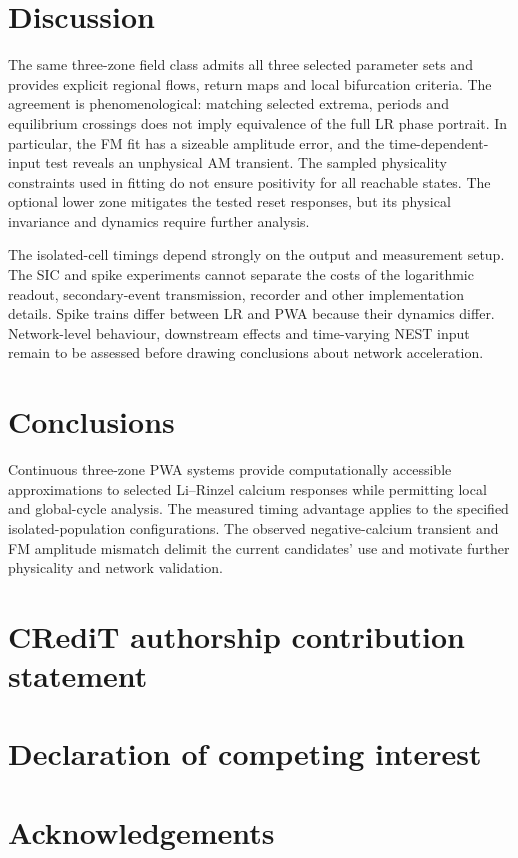 \documentclass[final,5p,times,twocolumn]{elsarticle}
\begin{document}
\section{Discussion}
\label{sec:discussion}
The same three-zone field class admits all three selected parameter sets and
provides explicit regional flows, return maps and local bifurcation criteria.
The agreement is phenomenological: matching selected extrema, periods and
equilibrium crossings does not imply equivalence of the full LR phase portrait.
In particular, the FM fit has a sizeable amplitude error, and the
time-dependent-input test reveals an unphysical AM transient. The sampled
physicality constraints used in fitting do not ensure positivity for all
reachable states. The optional lower zone mitigates the tested reset responses,
but its physical invariance and dynamics require further analysis.

The isolated-cell timings depend strongly on the output and measurement setup.
The SIC and spike experiments cannot separate the costs of the logarithmic
readout, secondary-event transmission, recorder and other implementation
details. Spike trains differ between LR and PWA because their dynamics differ.
Network-level behaviour, downstream effects and time-varying NEST input remain
to be assessed before drawing conclusions about network acceleration.

\section{Conclusions}
\label{sec:conclusions}
Continuous three-zone PWA systems provide computationally accessible
approximations to selected Li--Rinzel calcium responses while permitting local
and global-cycle analysis. The measured timing advantage applies to the
specified isolated-population configurations. The observed negative-calcium
transient and FM amplitude mismatch delimit the current candidates' use and
motivate further physicality and network validation.

\section*{CRediT authorship contribution statement}
\section*{Declaration of competing interest}
\section*{Acknowledgements}
\end{document}
